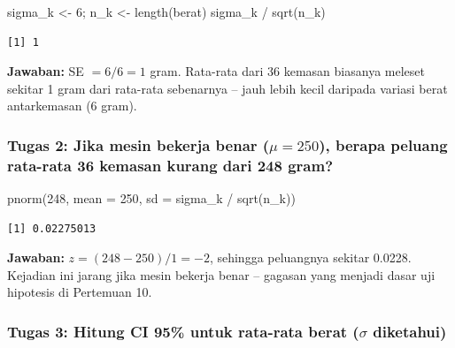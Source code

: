 \documentclass[
  indonesian,
  letterpaper,
]{book}
\newenvironment{Shaded}{\begin{snugshade}}{\end{snugshade}}
\newcommand{\AttributeTok}[1]{\textcolor[rgb]{0.40,0.45,0.13}{#1}}
\newcommand{\DecValTok}[1]{\textcolor[rgb]{0.68,0.00,0.00}{#1}}
\newcommand{\FunctionTok}[1]{\textcolor[rgb]{0.28,0.35,0.67}{#1}}
\newcommand{\NormalTok}[1]{\textcolor[rgb]{0.00,0.23,0.31}{#1}}
\newcommand{\OtherTok}[1]{\textcolor[rgb]{0.00,0.23,0.31}{#1}}
\newcommand{\SpecialCharTok}[1]{\textcolor[rgb]{0.37,0.37,0.37}{#1}}
\begin{document}
\begin{Shaded}
\begin{Highlighting}[]
\NormalTok{sigma\_k }\OtherTok{\textless{}{-}} \DecValTok{6}\NormalTok{; n\_k }\OtherTok{\textless{}{-}} \FunctionTok{length}\NormalTok{(berat)}
\NormalTok{sigma\_k }\SpecialCharTok{/} \FunctionTok{sqrt}\NormalTok{(n\_k)}
\end{Highlighting}
\end{Shaded}

\begin{verbatim}
[1] 1
\end{verbatim}

\textbf{Jawaban:} SE \(= 6/6 = 1\) gram. Rata-rata dari 36 kemasan
biasanya meleset sekitar 1 gram dari rata-rata sebenarnya -- jauh lebih
kecil daripada variasi berat antarkemasan (6 gram).

\subsubsection{\texorpdfstring{Tugas 2: Jika mesin bekerja benar
(\(\mu = 250\)), berapa peluang rata-rata 36 kemasan kurang dari 248
gram?}{Tugas 2: Jika mesin bekerja benar (\textbackslash mu = 250), berapa peluang rata-rata 36 kemasan kurang dari 248 gram?}}\label{tugas-2-jika-mesin-bekerja-benar-mu-250-berapa-peluang-rata-rata-36-kemasan-kurang-dari-248-gram}

\begin{Shaded}
\begin{Highlighting}[]
\FunctionTok{pnorm}\NormalTok{(}\DecValTok{248}\NormalTok{, }\AttributeTok{mean =} \DecValTok{250}\NormalTok{, }\AttributeTok{sd =}\NormalTok{ sigma\_k }\SpecialCharTok{/} \FunctionTok{sqrt}\NormalTok{(n\_k))}
\end{Highlighting}
\end{Shaded}

\begin{verbatim}
[1] 0.02275013
\end{verbatim}

\textbf{Jawaban:} \(z = (248 - 250)/1 = -2\), sehingga peluangnya
sekitar 0.0228. Kejadian ini jarang jika mesin bekerja benar -- gagasan
yang menjadi dasar uji hipotesis di Pertemuan 10.

\subsubsection{\texorpdfstring{Tugas 3: Hitung CI 95\% untuk rata-rata
berat (\(\sigma\)
diketahui)}{Tugas 3: Hitung CI 95\% untuk rata-rata berat (\textbackslash sigma diketahui)}}\label{tugas-3-hitung-ci-95-untuk-rata-rata-berat-sigma-diketahui}
\end{document}

